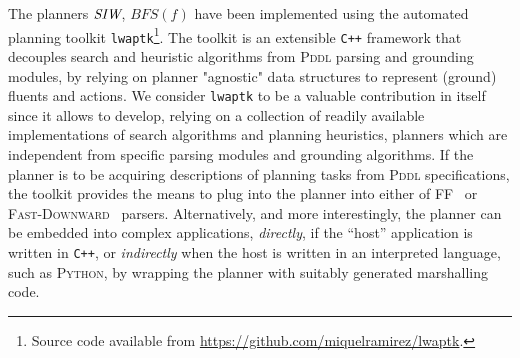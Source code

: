 The planners ${\textit{SIW}}$, $BFS(f)$ have been implemented using the automated planning
toolkit \texttt{lwaptk}\footnote{Source code available from
\url{https://github.com/miquelramirez/lwaptk}.}. The toolkit is an extensible \texttt{C++}
framework that decouples search and heuristic algorithms from \textsc{Pddl} parsing and grounding modules, by relying
on planner "agnostic" data structures to represent (ground) fluents and actions.
We consider \texttt{lwaptk} to be a valuable contribution in itself since it allows 
to develop, relying on a collection of readily available implementations of search algorithms and planning heuristics, 
planners which are independent from specific parsing modules and grounding algorithms. 
If the planner is to be acquiring descriptions of planning tasks from \textsc{Pddl} specifications, the toolkit
provides the means to plug into the planner into either of \textsc{FF}~\cite{hoffmann:ff}
or \textsc{Fast-Downward}~\cite{helmert:fd} parsers. Alternatively, and more interestingly,
the planner can be embedded into complex applications, \emph{directly}, if the ``host'' application is written in 
\texttt{C++}, or \emph{indirectly} when the host is written in an interpreted language, such as \textsc{Python}, 
by wrapping the planner with suitably generated marshalling code.
